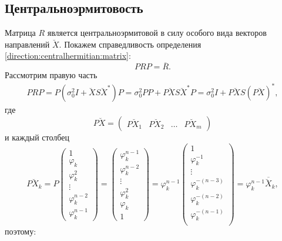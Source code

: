 \subsection{Центральноэрмитовость}

Матрица $R$ является центральноэрмитовой в силу особого вида векторов направлений $\breve{X}$. Покажем справедливость определения
\eqref{direction:centralhermitian:matrix}:
\[
    P R P = \overline{R} .
\]
Рассмотрим правую часть
\begin{multline*}
    P R P
    = P \left ( \sigma_0^2 I + \breve{X} S \breve{X}^* \right ) P
    = \sigma_0^2 P P + P \breve{X} S \breve{X}^* P
    = \sigma_0^2 I + P \breve{X} S \left( P \breve{X} \right)^*,
\end{multline*}
где
\[
    P \breve{X}
    = \begin{pmatrix}
        P \breve{X}_1 & P \breve{X}_2 & \dots & P \breve{X}_m
    \end{pmatrix}
\]
и каждый столбец
\[
    P \breve{X}_k
    = P \begin{pmatrix}
        1               \\
        \varphi_k       \\
        \varphi_k^2     \\
        \vdots          \\
        \varphi_k^{n-2} \\
        \varphi_k^{n-1}
    \end{pmatrix}
    = \begin{pmatrix}
        \varphi_k^{n-1} \\
        \varphi_k^{n-2} \\
        \vdots          \\
        \varphi_k^2     \\
        \varphi_k       \\
        1
    \end{pmatrix}
    = \varphi_k^{n-1}
    \begin{pmatrix}
        1                  \\
        \varphi_k^{-1}     \\
        \vdots             \\
        \varphi_k^{-(n-3)} \\
        \varphi_k^{-(n-2)} \\
        \varphi_k^{-(n-1)} \\
    \end{pmatrix}
    = \varphi_k^{n-1} \overline{\breve{X}}_k ,
\]
поэтому:
